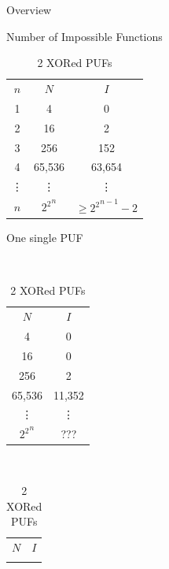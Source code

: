 \documentclass[10pt, compress]{beamer}
\begin{document}
\begin{frame}{Overview}
    \begin{table}[H]
    \caption{Number of Impossible Functions}
    \label{function_overview}    
    \def\arraystretch{1.45}
        \begin{subtable}{0.40\textwidth}
            \centering
            \begin{tabular}{|c|c|c|}
            \hline
            $n$     & $N$       & $I$                       \\ \Xhline{5\arrayrulewidth}
            1       & 4         & 0                         \\ \hline
            2       & 16        & 2                         \\ \hline
            3       & 256       & 152                       \\ \hline
            4       & 65,536    & 63,654                    \\ \hline
            \vdots  & \vdots    & \vdots                    \\ \hline
            $n$     & ${2^2}^n$ & $\geq	{2^2}^{n-1} - 2$    \\ \hline
            \end{tabular}
        \caption{One single PUF}
        \end{subtable}
        ~ 
        \begin{subtable}{0.28\textwidth}
            \centering
            \begin{tabular}{|c|c|}
            \hline
            $N$       & $I$       \\ \Xhline{5\arrayrulewidth}
            4         & 0         \\ \hline
            16        & 0         \\ \hline
            256       & 2         \\ \hline
            65,536    & 11,352    \\ \hline
            \vdots    & \vdots    \\ \hline
            ${2^2}^n$ & ???       \\ \hline
            \end{tabular}
        \caption{2 XORed PUFs}
        \end{subtable}
        ~
        \begin{subtable}{0.23\textwidth}
            \centering
            \begin{tabular}{|c|c|}
            \hline
            $N$       & $I$       \\ \Xhline{5\arrayrulewidth}

\end{tabular}
\end{subtable}
\end{table}
\end{frame}
\end{document}
